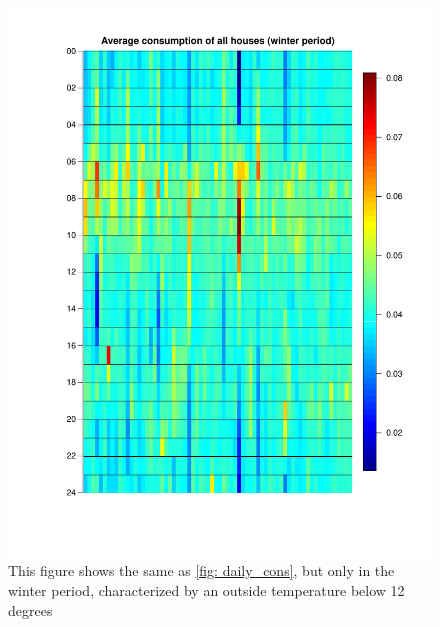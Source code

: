 \begin{figure}
    \centering
    \includegraphics[width=\textwidth]{../../../figures/Heatmap_winter.pdf}
    \caption{This figure shows the same as \cref{fig: daily_cons}, but only in the winter period, characterized by an outside temperature below 12 degrees}
    \label{fig: Hourcons_winter}
\end{figure}


